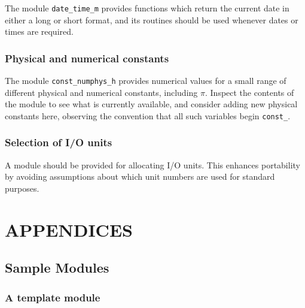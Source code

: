 \documentclass[11pt,twoside,a4paper]{report}
\begin{document}
The module \verb|date_time_m| provides functions which return the current
date in either a long or short format, and its routines should be used
whenever dates or times are required.

\section{Physical and numerical constants}
The module \verb|const_numphys_h| provides numerical values for a small
range of different physical and numerical constants, including $\pi$.
Inspect the contents of the module to see what is currently available,
and consider adding new physical constants here, observing the
convention that all such variables begin \verb|const_|.

\section{Selection of I/O units}

A module should be provided for allocating I/O units. This enhances
portability by avoiding assumptions about which unit numbers are used
for standard purposes.



\clearpage

%





%

\cleardoublepage
\appendix
{}

\part*{APPENDICES}
\chapter{Sample Modules}\label{sec:appa}

\section{A template module}
\label{sec:template}
\setlength{\oddsidemargin}{0.0mm}
\setlength{\evensidemargin}{\oddsidemargin}
\end{document}
